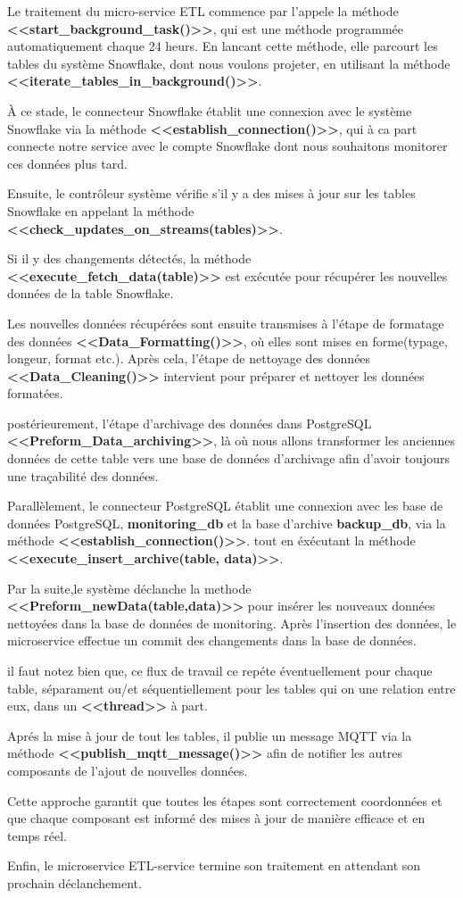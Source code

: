 \par Le traitement du micro-service ETL commence par l'appele la méthode \textbf{<<start\_background\_task()>>}, qui est une méthode programmée automatiquement chaque 24 heurs.
En lancant cette méthode, elle parcourt les tables du système Snowflake, dont nous voulons projeter, en utilisant la méthode \textbf{<<iterate\_tables\_in\_background()>>}.
\par À ce stade, le connecteur Snowflake établit une connexion avec le système Snowflake via la méthode \textbf{<<establish\_connection()>>}, 
qui à ca part connecte notre service avec le compte Snowflake dont nous souhaitons monitorer ces données plus tard.
\par Ensuite, le contrôleur système vérifie s'il y a des mises à jour sur les tables Snowflake en appelant la méthode \textbf{<<check\_updates\_on\_streams(tables)>>}. 
\par Si il y des changements détectés, la méthode \textbf{<<execute\_fetch\_data(table)>>} est exécutée pour récupérer les nouvelles données de la table Snowflake.
\par Les nouvelles données récupérées sont ensuite transmises à l'étape de formatage des données \newline \textbf{<<Data\_Formatting()>>}, où elles sont mises en forme(typage, longeur, format etc.). 
Après cela, l'étape de nettoyage des données \textbf{<<Data\_Cleaning()>>} intervient pour préparer et nettoyer les données formatées. 
\par postérieurement, l'étape d'archivage des données dans PostgreSQL \textbf{<<Preform\_Data\_archiving>>}, là où nous allons transformer les anciennes données de cette table vers une base de données d'archivage afin d'avoir toujours une traçabilité des données. 
\par Parallèlement, le connecteur PostgreSQL établit une connexion avec les base de données PostgreSQL, \textbf{monitoring\_db} et la base d'archive \textbf{backup\_db}, via la méthode \textbf{<<establish\_connection()>>}. 
tout en éxécutant la méthode \textbf{<<execute\_insert\_archive(table, data)>>}. 
\par Par la suite,le système déclanche la methode \textbf{<<Preform\_newData(table,data)>>} pour insérer les nouveaux données nettoyées dans la base de données de monitoring. 
Après l'insertion des données, le microservice effectue un commit des changements dans la base de données.
\par il faut notez bien que, ce flux de travail ce repéte éventuellement pour chaque table, séparament ou/et séquentiellement pour les tables qui on une relation entre eux, dans un \textbf{<<thread>>} à part.
\par Aprés la mise à jour de tout les tables, il publie un message MQTT via la méthode \newline \textbf{<<publish\_mqtt\_message()>>} afin de notifier les autres composants de l'ajout de nouvelles données. 
\par Cette approche garantit que toutes les étapes sont correctement coordonnées et que chaque composant est informé des mises à jour de manière efficace et en temps réel.
\par Enfin, le microservice ETL-service termine son traitement en attendant son prochain déclanchement.
